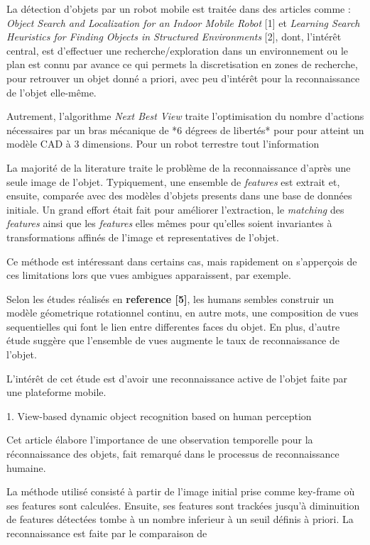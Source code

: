  La détection d'objets par un robot mobile est traitée dans des articles comme : \textit{Object Search and Localization for an Indoor Mobile Robot} [1] et \textit{Learning Search Heuristics for Finding Objects in Structured Environments} [2], dont, l'intérêt central, est d'effectuer une recherche/exploration dans un environnement ou le plan est connu par avance ce qui permets la discretisation en zones de recherche, pour retrouver un objet donné a priori, avec peu d'intérêt pour la reconnaissance de l'objet elle-même. 


  Autrement, l'algorithme \textit{Next Best View} traite l'optimisation du nombre d'actions nécessaires par un bras mécanique de *6 dégrees de libertés* pour pour atteint un modèle CAD à 3 dimensions. Pour un robot terrestre tout l'information

La majorité de la literature traite le problème de la reconnaissance d'après une seule image de l'objet. Typiquement, une ensemble de \textit{features} est extrait et, ensuite, comparée avec des modèles d'objets presents dans une base de données initiale. Un grand effort était fait pour améliorer l'extraction, le \textit{matching} des \textit{features} ainsi que les \textit{features} elles mêmes pour qu'elles soient invariantes à transformations affinés de l'image et representatives de l'objet.

Ce méthode est intéressant dans certains cas, mais rapidement on s'apperçois de ces limitations lors que vues ambigues apparaissent, par exemple.

Selon les études réalisés en \textbf{reference [5]}, les humans sembles construir un modèle géometrique rotationnel continu, en autre mots, une composition de vues sequentielles qui font le lien entre differentes faces du objet. En plus, d'autre étude suggère que l'ensemble de vues augmente le taux de reconnaissance de l'objet.

L'intérêt de cet étude est d'avoir une reconnaissance active de l'objet faite par une plateforme mobile.  


1. View-based dynamic object recognition based on human perception 

Cet article élabore l'importance de une observation temporelle pour la réconnaissance des objets, fait remarqué dans le processus de reconnaissance humaine.

La méthode utilisé consisté à partir de l'image initial prise comme key-frame où ses features sont calculées. Ensuite, ses features sont trackées jusqu'à diminuition de features détectées tombe à un nombre inferieur à un seuil définis à priori. La reconnaissance est faite par le comparaison de 



